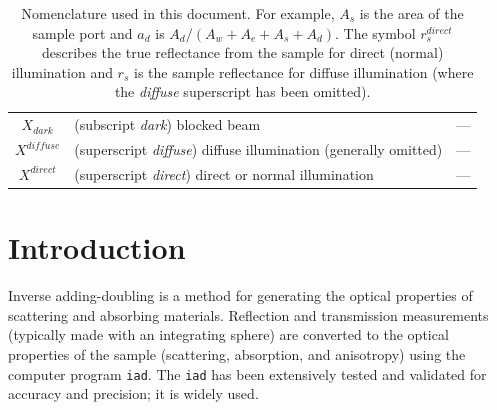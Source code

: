 \documentclass{article}
\newcommand\iadprog{\texttt{iad}}
\begin{document}
\begin{table}[b]
\begin{tabular}{cp{7cm}c}
$X_\mathit{dark}$ & (subscript \textit{dark}) blocked beam & ---\\
$X^{\mathit{diffuse}}$ & (superscript \textit{diffuse})  diffuse illumination (generally omitted)& ---\\
$X^{\mathit{direct}}$ & (superscript \textit{direct})  direct or normal illumination & ---\\
\end{tabular}
\caption{Nomenclature used in this document.  For example,
$A_s$ is the area of the sample port and $a_d$ is $A_d/(A_w+A_e+A_s+A_d)$.
The symbol
$r_s^\mathit{direct}$ describes the true reflectance from the sample
for direct (normal) illumination and $r_s$ is the sample reflectance
for diffuse illumination (where the \textit{diffuse} superscript has
been omitted).}
\end{table}


\clearpage
\section{Introduction}

Inverse adding-doubling is a method for generating the optical properties of
scattering and absorbing materials.  Reflection and transmission measurements (typically made with an
integrating sphere) are converted to the optical properties of the sample
(scattering, absorption, and anisotropy) using the computer program \iadprog{}.
The \iadprog{} has been extensively tested and validated for accuracy and 
precision; it is widely used\cite{chen06,chandra06,gebhart06,mishra06,degrand06,
giraev06,bargo05,bashkatov05,itoh05,zhao05,sardar05,chen05,thennadil05,jaeger05,
drakaki05,bashkatov05a,gebhart05,ramella-roman05,genina05,liu05,collier05,
swartling05,choi05,trivedi05,bashkatov04,klose05,black04,maswadi04,sardar04,
carp04,khan04,kim04,huber04,choi03,zhu03,lin03,collier03,das03,schulkin03,
rath03,swartling03,fabbri03,gannot03,pfefer03,zaccanti02,shimada02,villard02,
moffitt01,sardar01,sefkow01,shimada01,guo01,barton01,sardar01a,troy01,shah01,
du01,shimada00,youn00,morin00,dam00,barton99,balgi99,vries99,barton99a,nau99,
jones99,simpson98,michielsen98,sardar98,smithpeter98,verkruysse98,jacques98,
fukshansky-kaz98,beek97,tuchin97,chan96,vanstaveren97,coremans97,nilsson97,
yaroslavsky96,richardskortum96,sadhwani96,chan96a,nemati96,lin96,vanstaveren95,
vanstaveren96,gardner96,saidi95,proskurin95,papaioannou95,vanstaveren95a,
nilsson95,marquet95,eddowes95,hourdakis95,qu94,pickering94,tuchin94,
vanstaveren94,durkin93,pickering93,pickering93a}. 
\end{document}
